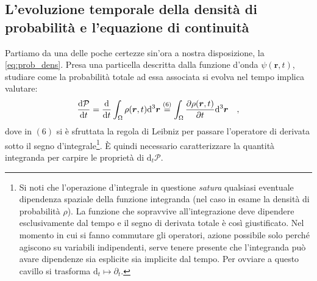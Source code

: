\subsection{L'evoluzione temporale della densità di probabilità e l'equazione di continuità}
Partiamo da una delle poche certezze sin'ora a nostra disposizione, la \eqref{eq:prob_dens}. Presa una particella descritta dalla funzione d'onda $\psi(\bm{r},t)$, studiare come la probabilità totale ad essa associata si evolva nel tempo implica valutare:
\begin{equation}
    \dv{\mathcal{P}}{t} = \dv{}{t} \int_\Omega \rho(\bm{r}, t) \dd^3{\bm{r}} \overset{(6)}{=} \int_\Omega \pdv{\rho(\bm{r}, t)}{t} \dd^3{\bm{r}} \quad,
    \label{eq:studio_dens_prob}
\end{equation}
dove in $(6)$ si è sfruttata la regola di Leibniz per passare l'operatore di derivata sotto il segno d'integrale\footnote{Si noti che l'operazione d'integrale in questione \emph{satura} qualsiasi eventuale dipendenza spaziale della funzione integranda (nel caso in esame la densità di probabilità $\rho$). La funzione che sopravvive all'integrazione deve dipendere esclusivamente dal tempo e il segno di derivata totale è così giustificato. Nel momento in cui si fanno commutare gli operatori, azione possibile solo perché agiscono su variabili indipendenti, serve tenere presente che l'integranda può avare dipendenze sia esplicite sia implicite dal tempo. Per ovviare a questo cavillo si trasforma $\text{d}_t \mapsto \partial_t$.}. È quindi necessario caratterizzare la quantità integranda per carpire le proprietà di $\text{d}_t \mathcal{P}$. 

